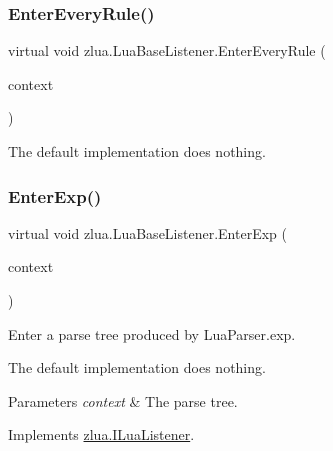 \subsubsection{\texorpdfstring{Enter\+Every\+Rule()}{EnterEveryRule()}}
{\footnotesize\ttfamily virtual void zlua.\+Lua\+Base\+Listener.\+Enter\+Every\+Rule (\begin{DoxyParamCaption}\item[{\mbox{[}\+Not\+Null\mbox{]} Parser\+Rule\+Context}]{context }\end{DoxyParamCaption})\hspace{0.3cm}{\ttfamily [virtual]}}

The default implementation does nothing.\mbox{\label{classzlua_1_1_lua_base_listener_a7a7e4ba1a91e217503b568da1213eaf4}} 
\subsubsection{\texorpdfstring{Enter\+Exp()}{EnterExp()}}
{\footnotesize\ttfamily virtual void zlua.\+Lua\+Base\+Listener.\+Enter\+Exp (\begin{DoxyParamCaption}\item[{\mbox{[}\+Not\+Null\mbox{]} \mbox{\hyperlink{classzlua_1_1_lua_parser_1_1_exp_context}{Lua\+Parser.\+Exp\+Context}}}]{context }\end{DoxyParamCaption})\hspace{0.3cm}{\ttfamily [virtual]}}



Enter a parse tree produced by Lua\+Parser.\+exp. 

The default implementation does nothing.


\begin{DoxyParams}{Parameters}
{\em context} & The parse tree.\\
\hline
\end{DoxyParams}


Implements \mbox{\hyperlink{interfacezlua_1_1_i_lua_listener_ac285772a04450f04a0552656841f1207}{zlua.\+I\+Lua\+Listener}}.

\mbox{\label{classzlua_1_1_lua_base_listener_a831fc10bcf2d08ebad6ac9768deb4230}} 
